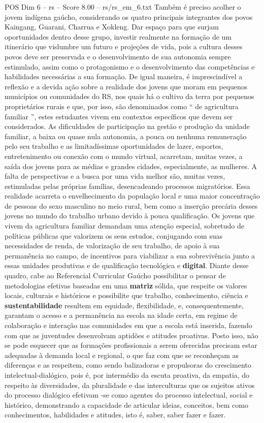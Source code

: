 \begin{textsample}{POS Dim 6 – rs – Score 8.00 – rs/rs\_em\_6.txt}
Também é preciso acolher o jovem indígena gaúcho, considerando os quatro principais integrantes dos povos Kaingang, Guarani, Charrua e Xokleng.
Dar espaço para que surjam oportunidades dentro desse grupo, investir realmente na formação de um itinerário que vislumbre um futuro e projeções de vida, pois a cultura desses povos deve ser preservada e o desenvolvimento de sua autonomia sempre estimulado, assim como o protagonismo e o desenvolvimento das competências e habilidades necessárias a sua formação.
De igual maneira, é imprescindível a reflexão e a devida ação sobre a realidade dos jovens que moram em pequenos municípios ou comunidades do RS, nos quais há o cultivo da terra por pequenos proprietários rurais e que, por isso, são denominados como “ de agricultura familiar ”, estes estudantes vivem em contextos específicos que devem ser considerados.
As dificuldades de participação na gestão e produção da unidade familiar, a baixa ou quase nula autonomia, a pouca ou nenhuma remuneração pelo seu trabalho e as limitadíssimas oportunidades de lazer, esportes, entretenimento ou conexão com o mundo virtual, acarretam, muitas vezes, a saída dos jovens para as médias e grandes cidades, especialmente, as mulheres.
A falta de perspectivas e a busca por uma vida melhor são, muitas vezes, estimuladas pelas próprias famílias, desencadeando processos migratórios.
Essa realidade acarreta o envelhecimento da população local e uma maior concentração de pessoas do sexo masculino no meio rural, bem como a inserção precária desses jovens no mundo do trabalho urbano devido à pouca qualificação.
Os jovens que vivem da agricultura familiar demandam uma atenção especial, sobretudo de políticas públicas que valorizem os seus estudos, conjugando com suas necessidades de renda, de valorização de seu trabalho, de apoio à sua permanência no campo, de incentivos para viabilizar a sua sobrevivência junto a essas unidades produtivas e de qualificação tecnológica e \textbf{digital}.
Diante desse quadro, cabe ao Referencial Curricular Gaúcho possibilitar o pensar de metodologias efetivas baseadas em uma \textbf{matriz} sólida, que respeite os valores locais, culturais e históricos e possibilite que trabalho, conhecimento, ciência e \textbf{sustentabilidade} resultem em equidade, flexibilidade, e, consequentemente, garantam o acesso e a permanência na escola na idade certa, em regime de colaboração e interação nas comunidades em que a escola está inserida, fazendo com que as juventudes desenvolvam aptidões e atitudes proativas.
Posto isso, não se pode esquecer que as formações profissionais a serem oferecidas precisam estar adequadas à demanda local e regional, o que faz com que se reconheçam as diferenças e as respeitem, como sendo balizadoras e propulsoras do crescimento intelectual-dialógico, pois é, por intermédio da escuta proativa, da empatia, do respeito às diversidades, da pluralidade e das interculturas que os sujeitos ativos do processo dialógico efetivam -se como agentes do processo intelectual, social e histórico, demonstrando a capacidade de articular ideias, conceitos, bem como conhecimentos, habilidades e atitudes, isto é, saber, saber fazer e fazer.

\end{textsample}
